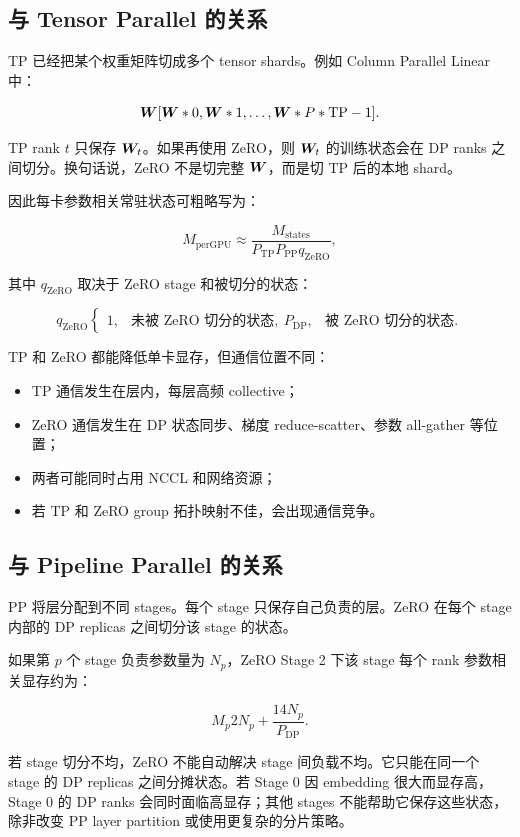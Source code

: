 \subsection{与 Tensor Parallel 的关系}
\label{subsec:zero-with-tensor-parallel}

TP 已经把某个权重矩阵切成多个 tensor shards。例如 Column Parallel Linear 中：

\[
\bm{W}
[\bm{W}*0,\bm{W}*1,\ldots,\bm{W}*{P*{\mathrm{TP}}-1}].
\]

TP rank $t$ 只保存 $\bm{W}_t$。如果再使用 ZeRO，则 $\bm{W}_t$ 的训练状态会在 DP ranks 之间切分。换句话说，ZeRO 不是切完整 $\bm{W}$，而是切 TP 后的本地 shard。

因此每卡参数相关常驻状态可粗略写为：

\[
M_{\mathrm{perGPU}}
\approx
\frac{M_{\mathrm{states}}}
{P_{\mathrm{TP}}P_{\mathrm{PP}}q_{\mathrm{ZeRO}}},
\]

其中 $q_{\mathrm{ZeRO}}$ 取决于 ZeRO stage 和被切分的状态：

\[
q_{\mathrm{ZeRO}}
\begin{cases}
1, & \text{未被 ZeRO 切分的状态},\
P_{\mathrm{DP}}, & \text{被 ZeRO 切分的状态}.
\end{cases}
\]

TP 和 ZeRO 都能降低单卡显存，但通信位置不同：

\begin{itemize}
\item TP 通信发生在层内，每层高频 collective；
\item ZeRO 通信发生在 DP 状态同步、梯度 reduce-scatter、参数 all-gather 等位置；
\item 两者可能同时占用 NCCL 和网络资源；
\item 若 TP 和 ZeRO group 拓扑映射不佳，会出现通信竞争。
\end{itemize}

\subsection{与 Pipeline Parallel 的关系}
\label{subsec:zero-with-pipeline-parallel}

PP 将层分配到不同 stages。每个 stage 只保存自己负责的层。ZeRO 在每个 stage 内部的 DP replicas 之间切分该 stage 的状态。

如果第 $p$ 个 stage 负责参数量为 $N_p$，ZeRO Stage 2 下该 stage 每个 rank 参数相关显存约为：

\[
M_p
2N_p
+
\frac{14N_p}{P_{\mathrm{DP}}}.
\]

若 stage 切分不均，ZeRO 不能自动解决 stage 间负载不均。它只能在同一个 stage 的 DP replicas 之间分摊状态。若 Stage 0 因 embedding 很大而显存高，Stage 0 的 DP ranks 会同时面临高显存；其他 stages 不能帮助它保存这些状态，除非改变 PP layer partition 或使用更复杂的分片策略。

